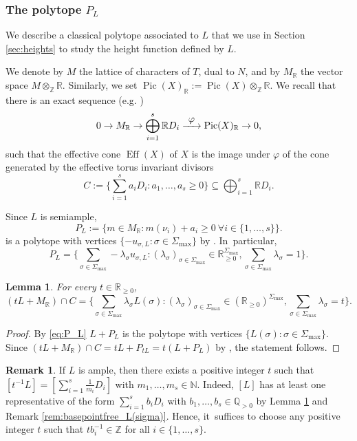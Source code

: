 \documentclass[JEP,XML,SOM,Unicode,published]{cedram}
\def\To#1{\mathchoice{\xrightarrow{\textstyle\kern4pt#1\kern3pt}}{\stackrel{#1}{\longrightarrow}}{}{}}
\newcommand\ZZ{\mathbb{Z}}
\newcommand\NN{\mathbb{N}}
\newcommand\RR{\mathbb{R}}
\newcommand\QQ{\mathbb{Q}}
\newcommand{\gen}[1]{\nu_{#1}}
\DeclareMathOperator{\pic}{Pic}
\DeclareMathOperator{\eff}{Eff}
\newtheorem{lemma}[theorem]{Lemma}
\theoremstyle{definition}
\newtheorem{remark}[theorem]{Remark}
\numberwithin{theorem}{section}
\begin{document}
\subsubsection{The polytope $P_L$}
We describe a classical polytope associated to $L$ that we use in
Section \ref{sec:heights} to study the height function defined by $L$.

We denote by $M$ the lattice of characters of $T$, dual to $N$,
and by $M_\RR$ the vector space $M\otimes_\ZZ \RR$.
Similarly, we set $\pic(X)_\RR:=\pic(X)\otimes_\ZZ\RR$.
We recall that there is an exact sequence (e.g. \cite[Th.\,4.2.1]{MR2810322})
\[
0
\to M_\RR
\to \bigoplus_{i=1}^s \RR D_i
\To{\varphi}\pic(X)_\RR
\to 0,
\]
such that the effective cone $\eff(X)$ of $X$ is the image under $\varphi$ of the cone generated by the
effective torus invariant divisors
\[
C:=\biggl \{\sum_{i=1}^s a_i D_i :
a_1,\dots, a_s\geq 0 \biggr \} \subseteq \bigoplus_{i=1}^s \RR D_i.
\]

Since $L$ is semiample,
\[
P_L:=\{m\in M_\RR: m(\gen{i})+a_i\geq 0\ \forall i\in\{1,\dots, s\}\}.
\]
is a polytope with vertices
$\{-u_{\sigma,L}:\sigma\in\Sigma_{\max}\}$
by \cite[Prop.\,4.3.8, Th.\,6.1.7]{MR2810322}. In~particular,
\begin{equation}
\label{eq:P_L}
P_L=\biggl\{\sum_{\sigma\in\Sigma_{\max}}-\lambda_\sigma u_{\sigma,L}:
(\lambda_\sigma)_{\sigma\in\Sigma_{\max}}\in\RR_{\geq0}^{\Sigma_{\max}},
\sum_{\sigma\in\Sigma_{\max}}\lambda_\sigma=1\biggr\}.
\end{equation}

\begin{lemma}
\label{lem:effective_cone}
For every $t\in\RR_{\geq0}$,
\[
(tL+M_\RR)\cap C=
\biggl \{\sum_{\sigma\in\Sigma_{\max}}\lambda_\sigma L(\sigma):
(\lambda_{\sigma})_{\sigma\in\Sigma_{\max}}\in (\RR_{\geq0})^{\Sigma_{\max}},
\sum_{\sigma\in\Sigma_{\max}}\lambda_{\sigma}=t \biggr \}.
\]
\end{lemma}
\begin{proof}
By \eqref{eq:P_L} $L+P_L$ is the polytope with vertices $\{L(\sigma):\sigma\in\Sigma_{\max}\}$.
Since $(tL+M_\RR)\cap C=tL+P_{tL}=t(L+P_L)$
by \cite[Exer.\,4.3.2]{MR2810322}, the statement follows.
\end{proof}

\begin{remark}
\label{rem:L_weights}
If $L$ is ample, then there exists a positive integer $t$
such that $[t^{-1}L]=\left [\sum_{i=1}^s\frac 1{m_i} D_i \right]$ with $m_1,\dots,m_s\in\NN$.
Indeed, $[L]$ has at least one representative of the form $\sum_{i=1}^sb_i D_i$
with $b_1,\dots,b_s\in \QQ_{>0}$ by Lemma \ref{lem:effective_cone}
and Remark \ref{rem:basepointfree_L(sigma)}.
Hence, it~suffices to choose any positive integer $t$ such that
$t b_i^{-1}\in\ZZ$ for all $i\in\{1,\dots,s\}$.
\end{remark}
\end{document}
